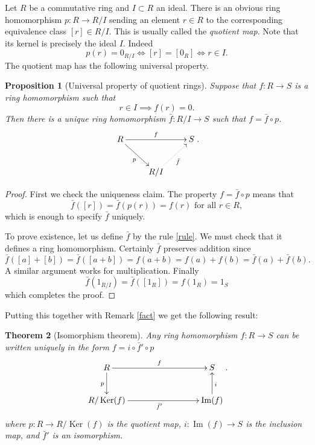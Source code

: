 \documentclass [12pt,oneside,a4paper,mathscr]{amsart}
\newtheorem{thm}{Theorem}[section]
\newtheorem{prop}[thm]{Proposition}
\theoremstyle{definition}
\newtheorem{remark}[thm]{Remark}
\newcommand{\im}{\operatorname{Im}}
\renewcommand{\ker}{\operatorname{Ker}}
\begin{document}
Let $R$ be a commutative ring and $I\subset R$ an ideal. There is an obvious ring homomorphism $p\colon R\to R/I$ sending an element  $r\in R$ to the corresponding equivalence class $[r]\in R/I$. This is usually called the \emph{quotient map}. Note that its kernel is precisely the ideal $I$. Indeed
\[p(r)=0_{R/I} \iff [r]=[0_R] \iff  r\in I.\]
The quotient map has the following universal property.

\begin{prop}[Universal property of quotient rings]
\label{factor}
Suppose that $f\colon R\to S$ is a ring homomorphism such that\[
r\in I \implies f(r)=0.\]
 Then there is a unique ring homomorphism $\bar{f}\colon R/I \to S$ such that $f=\bar{f}\circ p$.
\[\xymatrix{ R \ar@{>}[rr]^{f} \ar@{>}[dr]_{p} && S \\ &R/I \ar@{..>}[ur]_{\bar{f}}}.\]
\end{prop}

\begin{proof}
First we check the uniqueness claim. The property  $f=\bar{f}\circ p$ means that \begin{equation}
\label{rule}\bar{f}([r])=\bar{f}(p(r))=f(r) \text{ for all } r\in R,\end{equation}
which is enough to specify $\bar{f}$ uniquely. 

To prove existence, let us define  $\bar{f}$ by the rule \eqref{rule}. We must check that it defines a ring homomorphism. Certainly $\bar{f}$ preserves addition since
\[\bar{f}( [a]+[b])=\bar{f}([a+b])=f(a+b)=f(a)+f(b)=\bar{f}(a) + \bar{f}(b).\]
A similar argument works for multiplication. Finally \[\bar{f}(1_{R/I})=\bar{f}([1_R])=f(1_R)=1_S\]
which completes the proof.
 \end{proof}




Putting this together with Remark  \ref{fact} we get the following result:

\begin{thm}[Isomorphism theorem]
Any ring homomorphism $f\colon R \to S$ can be written uniquely in the form $f=i\circ \bar{f}'\circ p$ \[\xymatrix{ R \ar@{>}[rrr]^{f} \ar@{>}[d]_{p} &&& S \\ R/\ker(f) \ar@{>}[rrr]_{\bar{f}'} &&& \im(f)\ar@{>}[u]_{i}}.\]
where $p\colon R\to R/\ker(f)$ is the quotient map, $i\colon \im(f)\to S$ is the inclusion map, and $\bar{f}'$ is an isomorphism.
\end{thm}
 
\end{document}
